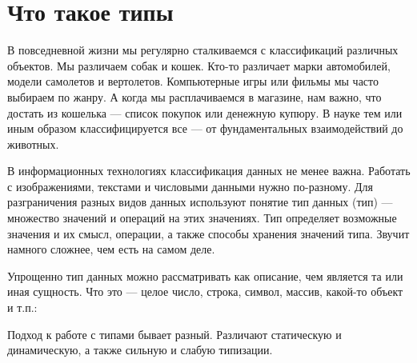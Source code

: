 \documentclass[book.tex]{subfiles}
\begin{document}



\maketitle 

\section*{Что такое типы}

В повседневной жизни мы регулярно сталкиваемся с классификаций различных объектов. Мы различаем собак и кошек. Кто-то различает марки автомобилей, модели самолетов и вертолетов. Компьютерные игры или фильмы мы часто выбираем по жанру. А когда мы расплачиваемся в магазине, нам важно, что достать из кошелька --- список покупок или денежную купюру. В науке тем или иным образом классифицируется все --- от фундаментальных взаимодействий до животных.

В информационных технологиях классификация данных не менее важна. Работать с изображениями, текстами и числовыми данными нужно по-разному. Для разграничения разных видов данных используют понятие тип данных (тип) --- множество значений и операций на этих значениях. Тип определяет возможные значения и их смысл, операции, а также способы хранения значений типа. Звучит намного сложнее, чем есть на самом деле.

Упрощенно тип данных можно рассматривать как описание, чем является та или иная сущность. Что это --- целое число, строка, символ, массив, какой-то объект и т.п.:


Подход к работе с типами бывает разный. Различают статическую и динамическую, а также сильную и слабую типизации.

\end{document}
